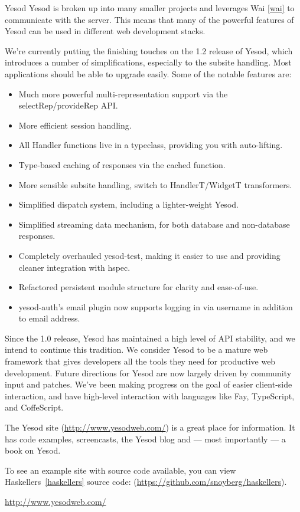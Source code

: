 \begin{hcarentry}{Yesod}
Yesod is broken up into many smaller projects and leverages Wai \cref{wai} to communicate with the server. This means that many of the powerful features of Yesod can be used in different web development stacks.

We're currently putting the finishing touches on the 1.2 release of Yesod, which introduces a number of simplifications, especially to the subsite handling. Most applications should be able to upgrade easily. Some of the notable features are:

\begin{itemize}
\item Much more powerful multi-representation support via the selectRep/provideRep API.
\item More efficient session handling.
\item All Handler functions live in a typeclass, providing you with auto-lifting.
\item Type-based caching of responses via the cached function.
\item More sensible subsite handling, switch to HandlerT/WidgetT transformers.
\item Simplified dispatch system, including a lighter-weight Yesod.
\item Simplified streaming data mechanism, for both database and non-database responses.
\item Completely overhauled yesod-test, making it easier to use and providing cleaner integration with hspec.
\item Refactored persistent module structure for clarity and ease-of-use.
\item yesod-auth's email plugin now supports logging in via username in addition to email address.
\end{itemize}

Since the 1.0 release, Yesod has maintained a high level of API stability, and we intend to continue this tradition. We consider Yesod to be a mature web framework that gives developers all the tools they need for productive web development. Future directions for Yesod are now largely driven by community input and patches. We've been making progress on the goal of easier client-side interaction, and have high-level interaction with languages like Fay, TypeScript, and CoffeScript.

The Yesod site (\url{http://www.yesodweb.com/}) is a great place for information. It has code examples, screencasts, the Yesod blog and --- most importantly --- a book on Yesod.

To see an example site with source code available, you can view Haskellers~\cref{haskellers} source code: (\url{https://github.com/snoyberg/haskellers}).

\FurtherReading 
\url{http://www.yesodweb.com/} 
\end{hcarentry} 
